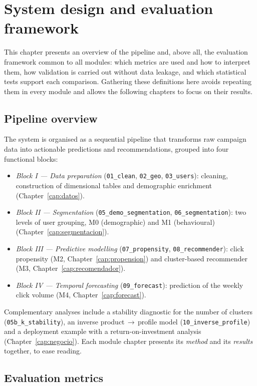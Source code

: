 \chapter{System design and evaluation framework}
\label{cap:evaluacion}

This chapter presents an overview of the pipeline and, above all, the evaluation framework common to all modules: which metrics are used and how to interpret them, how validation is carried out without data leakage, and which statistical tests support each comparison. Gathering these definitions here avoids repeating them in every module and allows the following chapters to focus on their results.

\section{Pipeline overview}

The system is organised as a sequential pipeline that transforms raw campaign data into actionable predictions and recommendations, grouped into four functional blocks:
\begin{itemize}
    \item \emph{Block I — Data preparation} (\texttt{01\_clean}, \texttt{02\_geo}, \texttt{03\_users}): cleaning, construction of dimensional tables and demographic enrichment (Chapter~\ref{cap:datos}).
    \item \emph{Block II — Segmentation} (\texttt{05\_demo\_segmentation}, \texttt{06\_segmentation}): two levels of user grouping, M0 (demographic) and M1 (behavioural) (Chapter~\ref{cap:segmentacion}).
    \item \emph{Block III — Predictive modelling} (\texttt{07\_propensity}, \texttt{08\_recommender}): click propensity (M2, Chapter~\ref{cap:propension}) and cluster-based recommender (M3, Chapter~\ref{cap:recomendador}).
    \item \emph{Block IV — Temporal forecasting} (\texttt{09\_forecast}): prediction of the weekly click volume (M4, Chapter~\ref{cap:forecast}).
\end{itemize}
Complementary analyses include a stability diagnostic for the number of clusters (\texttt{05b\_k\_stability}), an inverse product\,$\rightarrow$\,profile model (\texttt{10\_inverse\_profile}) and a deployment example with a return-on-investment analysis (Chapter~\ref{cap:negocio}). Each module chapter presents its \emph{method} and its \emph{results} together, to ease reading.

\section{Evaluation metrics}
\label{sec:metricas}

